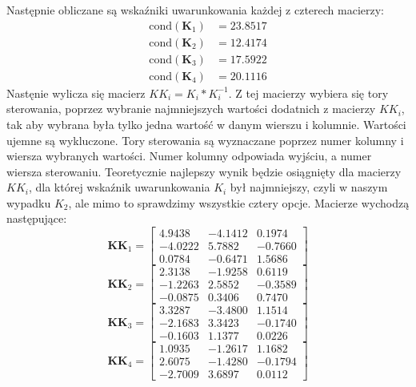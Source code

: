Następnie obliczane są wskaźniki uwarunkowania każdej z czterech macierzy:
\begin{align}
  \text{cond}(\bm{K}_1) &= \num{23.8517} \\
  \text{cond}(\bm{K}_2) &=  \num{12.4174} \\
  \text{cond}(\bm{K}_3) &= \num{17.5922} \\
  \text{cond}(\bm{K}_4) &= \num{20.1116}
\end{align}
Nastęnie wylicza się macierz $KK_i = K_i * K_i^{-1}$. Z tej macierzy
wybiera się tory sterowania, poprzez wybranie najmniejszych wartości dodatnich
z macierzy $KK_i$, tak aby wybrana była tylko jedna wartość w danym wierszu i kolumnie.
Wartości ujemne są wykluczone. Tory sterowania są wyznaczane poprzez numer kolumny
i wiersza wybranych wartości. Numer kolumny odpowiada wyjściu, a numer wiersza sterowaniu.
Teoretycznie najlepszy wynik będzie osiągnięty dla
macierzy $KK_i$, dla której wskaźnik uwarunkowania $K_i$ był najmniejszy, czyli
w naszym wypadku $K_2$, ale mimo to sprawdzimy wszystkie cztery opcje. Macierze
wychodzą następujące:
\begin{equation}
  \bm{KK}_1 =
  \begin{bmatrix}
   \num{ 4.9438} &  \num{-4.1412}  & \num{ 0.1974} \\
   \num{-4.0222}  & \num{ 5.7882}  & \num{-0.7660} \\
   \num{ 0.0784} &  \num{-0.6471} &  \num{ 1.5686}
  \end{bmatrix}
\end{equation}
\begin{equation}
  \bm{KK}_2 =
  \begin{bmatrix}
   \num{ 2.3138} &  \num{-1.9258}  & \num{ 0.6119} \\
   \num{-1.2263}   & \num{ 2.5852}  & \num{-0.3589} \\
   \num{-0.0875}   &\num{ 0.3406} &  \num{ 0.7470}
  \end{bmatrix}
\end{equation}
\begin{equation}
  \bm{KK}_3 =
  \begin{bmatrix}
   \num{ 3.3287} &  \num{-3.4800}  & \num{ 1.1514} \\
   \num{-2.1683}  & \num{ 3.3423} &  \num{-0.1740} \\
   \num{-0.1603}  & \num{ 1.1377}  & \num{ 0.0226}
  \end{bmatrix}
\end{equation}
\begin{equation}
  \bm{KK}_4 =
  \begin{bmatrix}
   \num{ 1.0935}  & \num{-1.2617}  & \num{ 1.1682} \\
   \num{ 2.6075} &  \num{-1.4280}  & \num{-0.1794} \\
   \num{-2.7009}  & \num{ 3.6897} &  \num{ 0.0112}
  \end{bmatrix}
\end{equation}
